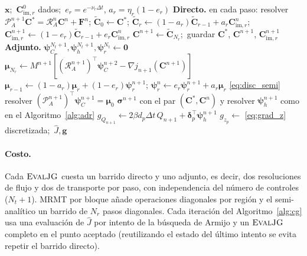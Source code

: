 \documentclass[11pt]{article}
\numberwithin{equation}{section}
\theoremstyle{plain}
\theoremstyle{definition}
\theoremstyle{remark}
\newcommand{\im}{\mathrm{im}}
\begin{document}
\begin{algorithm}[h]
\caption{\textsc{EvalJG} para MRMT semi-analítico}
\label{alg:semi}
\begin{algorithmic}[1]
\Require $\mathbf{x}$;\ $\mathbf{C}_{\im,r}^0$ dados;\ $e_r=e^{-\nu_r\Delta t}$, $a_r=\eta_r(1-e_r)$
\State \textbf{Directo.} en cada paso: resolver $\mathcal{P}_A^{n+1}\mathbf{C}^*=\mathcal{R}_A^n\mathbf{C}^n+\mathbf{F}^n$;
  $\tilde{\mathbf{C}}_0\gets\mathbf{C}^*$;
    \State $\tilde{\mathbf{C}}_r\gets(1-a_r)\tilde{\mathbf{C}}_{r-1}+a_r\mathbf{C}_{\im,r}^n$;\quad
           $\mathbf{C}_{\im,r}^{n+1}\gets(1-e_r)\tilde{\mathbf{C}}_{r-1}+e_r\mathbf{C}_{\im,r}^n$
  \EndFor
  \State $\mathbf{C}^{n+1}\gets\tilde{\mathbf{C}}_{N_r}$;\ guardar $\mathbf{C}^*$, $\mathbf{C}^{n+1}$, $\mathbf{C}_{\im,r}^{n+1}$
\State \textbf{Adjunto.} $\boldsymbol\psi_C^{N_t+1},\boldsymbol\psi_h^{N_t+1},\boldsymbol\psi_r^{N_t}\gets\mathbf{0}$
  \State $\boldsymbol\mu_{N_r}\gets M^{n+1}[(\mathcal{R}_A^{n+1})^\top\boldsymbol\psi_C^{n+2}-\nabla j_{n+1}(\mathbf{C}^{n+1})]$
   
    \State $\boldsymbol\mu_{r-1}\gets(1-a_r)\boldsymbol\mu_r+(1-e_r)\boldsymbol\psi_r^{n+1}$;\quad
           $\boldsymbol\psi_r^{n}\gets e_r\boldsymbol\psi_r^{n+1}+a_r\boldsymbol\mu_r$ \hfill \eqref{eq:disc_semi}
  \EndFor
  \State resolver $(\mathcal{P}_A^{n+1})^\top\boldsymbol\psi_C^{n+1}=\boldsymbol\mu_0$
  \State $\boldsymbol\sigma^{n+1}$ con el par $(\mathbf{C}^*,\mathbf{C}^n)$ y resolver $\boldsymbol\psi_h^{n+1}$ como en el Algoritmo~\ref{alg:adr}
  \State $g_{Q_{n+1}}\gets2\beta d_p\Delta t\,Q_{n+1}+\boldsymbol\delta_p^\top\boldsymbol\psi_h^{n+1}$
\EndFor
\State $g_{z_p}\gets$ \eqref{eq:grad_z} discretizada;\ \Return $\hat J,\mathbf{g}$
\end{algorithmic}
\end{algorithm}

\paragraph{Costo.} Cada $\textsc{EvalJG}$ cuesta un barrido directo y uno adjunto, es decir, dos resoluciones de flujo y dos de
transporte por paso, con independencia del número de controles ($N_t+1$). MRMT por bloque añade operaciones diagonales
por región y el semi-analítico un barrido de $N_r$ pasos diagonales. Cada iteración del Algoritmo~\ref{alg:cg} usa una
evaluación de $\hat J$ por intento de la búsqueda de Armijo y un $\textsc{EvalJG}$ completo en el punto aceptado (reutilizando el estado del último intento se evita repetir el barrido directo).
\end{document}
